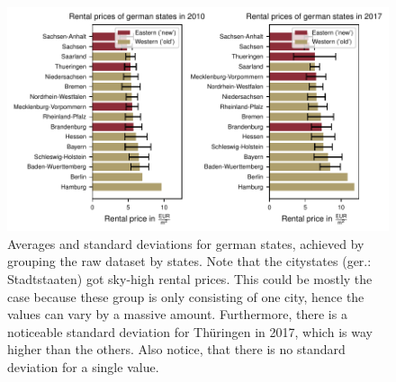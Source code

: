 \documentclass{article}
\begin{document}
	\begin{figure}
	\centering
	\includegraphics[width=1\linewidth]{../fig/figures/barchart_state_comparison.pdf}
	\caption{Averages and standard deviations for german states, achieved by grouping the raw dataset by states. Note that the citystates (ger.: Stadtstaaten) got sky-high rental prices. This could be mostly the case because these group is only consisting of one city, hence the values can vary by a massive amount. Furthermore, there is a noticeable standard deviation for Thüringen in 2017, which is way higher than the others. Also notice, that there is no standard deviation for a single value.}
	\label{barchart_state_comparison}
	\end{figure}
	\newpage
	
\end{document}
